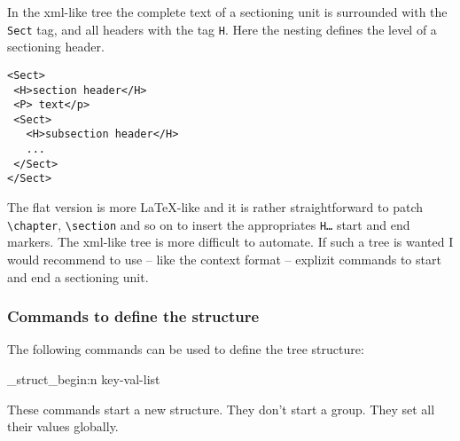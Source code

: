\documentclass[DIV=12,parskip=half-,bibliography=totoc]{scrartcl}
\begin{document}
In the xml-like tree the complete text of a sectioning unit is surrounded with the \texttt{Sect} tag, and all headers
with the tag \texttt{H}. Here the nesting defines the level of a sectioning header.

\begin{lstlisting}
<Sect>
 <H>section header</H>
 <P> text</p>
 <Sect>
   <H>subsection header</H>
   ...
 </Sect>
</Sect>
\end{lstlisting}

The flat version is more \LaTeX-like and it is rather straightforward to patch \verb+\chapter+, \verb+\section+ and so on to insert the appropriates \texttt{H\ldots} start and end markers. The xml-like tree is more difficult to automate. If such a tree is wanted I would recommend to use -- like the context format -- explizit commands to start and end a sectioning unit.

\subsubsection{Commands to define the structure}
The following commands can be used to define the tree structure:

\ExplSyntaxOn
\DescribeMacro{}
\DescribeMacro\uftag_struct_begin:n {key-val-list}
\ExplSyntaxOff

These commands start a new structure. They don't start a group. They set all their values globally.
\end{document}
